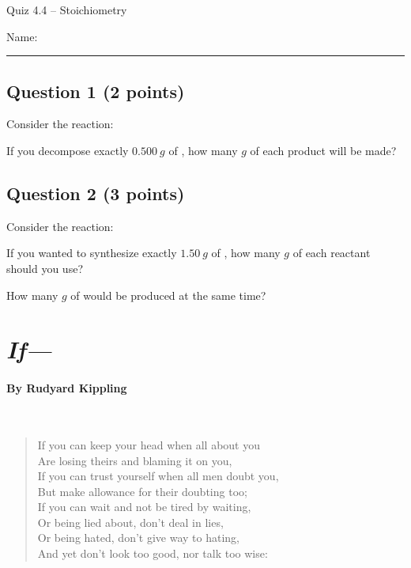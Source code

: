 \documentclass[11pt, letterpaper]{memoir}
\begin{document}
	\begin{center}
		{\large	Quiz 4.4 -- Stoichiometry}
	\end{center}
{\large Name: \rule[-1mm]{4in}{.1pt}
	
	\subsection*{Question 1 (2 points)}
	Consider the reaction: 
	
	\noindent
	If you decompose exactly $0.500~g$ of , how many $g$ of each product will be made?
	
	\vspace{15em}
	\subsection*{Question 2 (3 points)}
	Consider the reaction: 
	
	\noindent
	If you wanted to synthesize exactly $1.50~g$ of , how many $g$ of each reactant should you use?
	
	\vspace{15em}
	\noindent 
	How many $g$ of  would be produced at the same time?
\newpage
\pagestyle{empty}
\addtocounter{page}{-1}
\section*{\emph{If---}}
\paragraph{By Rudyard Kippling}~
\begin{verse}
	If you can keep your head when all about you\\
	\hspace{0.5em} Are losing theirs and blaming it on you,\\
	If you can trust yourself when all men doubt you,\\
	\hspace{0.5em} But make allowance for their doubting too;\\
	If you can wait and not be tired by waiting,\\
	\hspace{0.5em} Or being lied about, don’t deal in lies,\\
	Or being hated, don’t give way to hating,\\
	\hspace{0.5em} And yet don’t look too good, nor talk too wise:


\end{verse}}
\end{document}
